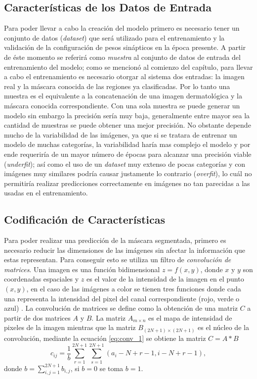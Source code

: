 \subsection{Características de los Datos de Entrada}
Para poder llevar a cabo la creación del modelo primero es necesario tener un conjunto de datos (\emph{dataset}) que será utilizado para el entrenamiento y la validación de la configuración de pesos sinápticos en la época presente.
A partir de éste momento se referirá como \emph{muestra} al conjunto de datos de entrada del entrenamiento del modelo; como se mencionó al comienzo del capítulo, para llevar a cabo el entrenamiento es necesario otorgar al sistema dos entradas: la imagen real y la máscara conocida de las regiones ya clasificadas. Por lo tanto una muestra es el equivalente a la concatenación de una imagen dermatológica y la máscara conocida correspondiente. Con una sola muestra se puede generar un modelo sin embargo la precisión sería muy baja, generalmente entre mayor sea la cantidad de muestras se puede obtener una mejor precisión. No obstante depende mucho de la variabilidad de las imágenes, ya que si se tratara de entrenar un modelo de muchas categorías, la variabilidad haría mas complejo el modelo y por ende requeriría de un mayor número de épocas para alcanzar una precisión viable (\emph{underfit}); así como el uso de un \emph{dataset} muy extenso de pocas categorías y con imágenes muy similares podría causar justamente lo contrario (\emph{overfit}), lo cuál no permitiría realizar predicciones correctamente en imágenes no tan parecidas a las usadas en el entrenamiento.

\subsection{Codificación de Características}
Para poder realizar una predicción de la máscara segmentada, primero es necesario reducir las dimensiones de las imágenes sin afectar la información que estas representan. Para conseguir esto se utiliza un filtro de \emph{convolución de matrices}. Una imagen es una función bidimensional $ z = f(x,y)$, donde $x$ y $y$ son coordenadas espaciales y $z$ es el valor de la intensidad de la imagen en el punto $(x , y)$, en el caso de las imágenes a color se tienen tres funciones donde cada una representa la intensidad del pixel del canal correspondiente (rojo, verde o azul) \citep[~p. 100]{conv_1}. La convolución de matrices se define como la obtención de una matriz $C$ a partir de dos matrices $A$ y $B$. La matriz $A_{m \times n}$ es el mapa de intensidad de pixeles de la imagen mientras que la matriz $B_{(2N+1) \times (2N+1)}$ es el núcleo de la convolución, mediante la ecuación \ref{eq:conv_1} se obtiene la matriz $C = A * B$
\begin{equation}
c_{ij} = \frac{1}{b} \sum_{r=1}^{2N+1}\sum_{s=1}^{2N+1}(a_i-N+r-1, i-N+r-1),
\label{eq:conv_1}
\end{equation}
donde $b = \sum_{i,j=1}^{2N+1} b_{i,j}$, si $b=0$ se toma $b=1$.

